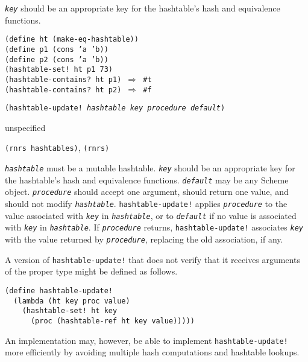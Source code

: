 \texttt{\textit{key}} should be an appropriate key for the hashtable's
hash and equivalence functions.

\begin{alltt}
(define ht (make-eq-hashtable))
(define p1 (cons 'a 'b))
(define p2 (cons 'a 'b))
(hashtable-set! ht p1 73)
(hashtable-contains? ht p1) \(\Rightarrow\) \#{}t
(hashtable-contains? ht p2) \(\Rightarrow\) \#{}f
\end{alltt}

\begin{description}

\label{objects_s283}\item[procedure] \texttt{(hashtable-update! \textit{hashtable} \textit{key} \textit{procedure} \textit{default})}



\item[returns] unspecified


\item[libraries] \texttt{(rnrs hashtables)}, \texttt{(rnrs)}
\end{description}

\texttt{\textit{hashtable}} must be a mutable hashtable.
\texttt{\textit{key}} should be an appropriate key for the hashtable's
hash and equivalence functions.
\texttt{\textit{default}} may be any Scheme object.
\texttt{\textit{procedure}} should accept one argument, should return one value, and should
not modify \texttt{\textit{hashtable}}.
\texttt{hashtable-update!} applies \texttt{\textit{procedure}} to the value associated with
\texttt{\textit{key}} in \texttt{\textit{hashtable}}, or to \texttt{\textit{default}} if no value is associated with
\texttt{\textit{key}} in \texttt{\textit{hashtable}}.
If \texttt{\textit{procedure}} returns, \texttt{hashtable-update!} associates \texttt{\textit{key}}
with the value returned by \texttt{\textit{procedure}}, replacing the old association,
if any.

A version of \texttt{hashtable-update!} that does not verify that it receives
arguments of the proper type might be defined as follows.


\begin{alltt}
(define hashtable-update!
  (lambda (ht key proc value)
    (hashtable-set! ht key
      (proc (hashtable-ref ht key value)))))
\end{alltt}


An implementation may, however, be able to implement
\texttt{hashtable-update!} more efficiently by avoiding multiple
hash computations and hashtable lookups.


